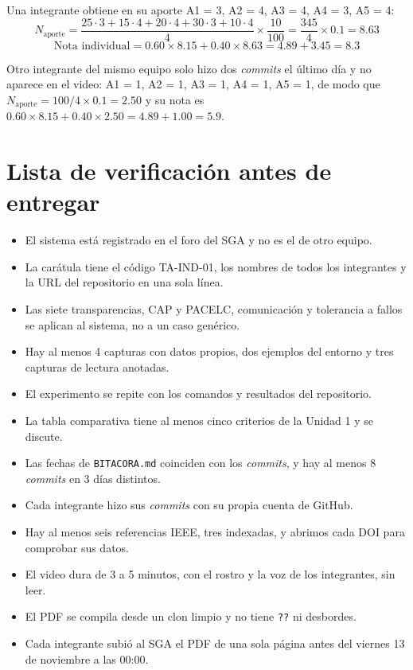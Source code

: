 \documentclass[11pt,a4paper]{article}
\begin{document}
Una integrante obtiene en su aporte A1 = 3, A2 = 4, A3 = 4, A4 = 3, A5 = 4:
\[ N_{\text{aporte}} = \frac{25\cdot3 + 15\cdot4 + 20\cdot4 + 30\cdot3 + 10\cdot4}{4}\times\frac{10}{100} = \frac{345}{4}\times 0.1 = 8.63 \]
\[ \text{Nota individual} = 0.60 \times 8.15 + 0.40 \times 8.63 = 4.89 + 3.45 = 8.3 \]

Otro integrante del mismo equipo solo hizo dos \emph{commits} el último día y no aparece en el video: A1 = 1, A2 = 1, A3 = 1, A4 = 1, A5 = 1, de modo que $N_{\text{aporte}} = 100/4 \times 0.1 = 2.50$ y su nota es $0.60 \times 8.15 + 0.40 \times 2.50 = 4.89 + 1.00 = 5.9$.

\section{Lista de verificación antes de entregar}

\begin{okBox}[title={Revisen su informe con esta lista}]
	\begin{itemize}
		\item[$\square$] El sistema está registrado en el foro del SGA y no es el de otro equipo.
		\item[$\square$] La carátula tiene el código TA-IND-01, los nombres de todos los integrantes y la URL del repositorio en una sola línea.
		\item[$\square$] Las siete transparencias, CAP y PACELC, comunicación y tolerancia a fallos se aplican al sistema, no a un caso genérico.
		\item[$\square$] Hay al menos 4 capturas con datos propios, dos ejemplos del entorno y tres capturas de lectura anotadas.
		\item[$\square$] El experimento se repite con los comandos y resultados del repositorio.
		\item[$\square$] La tabla comparativa tiene al menos cinco criterios de la Unidad 1 y se discute.
		\item[$\square$] Las fechas de \texttt{BITACORA.md} coinciden con los \emph{commits}, y hay al menos 8 \emph{commits} en 3 días distintos.
		\item[$\square$] Cada integrante hizo sus \emph{commits} con su propia cuenta de GitHub.
		\item[$\square$] Hay al menos seis referencias IEEE, tres indexadas, y abrimos cada DOI para comprobar sus datos.
		\item[$\square$] El video dura de 3 a 5 minutos, con el rostro y la voz de los integrantes, sin leer.
		\item[$\square$] El PDF se compila desde un clon limpio y no tiene \texttt{??} ni desbordes.
		\item[$\square$] Cada integrante subió al SGA el PDF de una sola página antes del viernes 13 de noviembre a las 00:00.
	\end{itemize}
\end{okBox}
\end{document}
